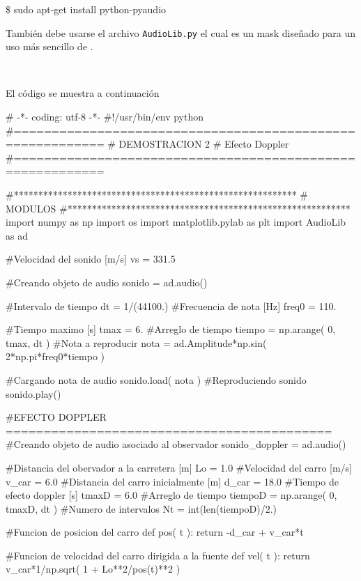 \begin{listing}[style=consola, numbers=none]
\$ sudo apt-get install python-pyaudio
\end{listing}

También debe usarse el archivo \texttt{AudioLib.py} el cual es un mask 
diseñado para un uso más sencillo de \pyaudio.

\

El código se muestra a continuación


\begin{listing}[style=python]
# -*- coding: utf-8 -*-
#!/usr/bin/env python
#==========================================================
# DEMOSTRACION 2
# Efecto Doppler
#==========================================================

#**********************************************************
#	MODULOS
#**********************************************************
import numpy as np
import os
import matplotlib.pylab as plt
import AudioLib as ad

#Velocidad del sonido [m/s]
vs = 331.5

#Creando objeto de audio
sonido = ad.audio()

#Intervalo de tiempo
dt = 1/(44100.)
#Frecuencia de nota [Hz]
freq0 = 110.

#Tiempo maximo	[s]
tmax = 6.
#Arreglo de tiempo
tiempo = np.arange( 0, tmax, dt )
#Nota a reproducir
nota = ad.Amplitude*np.sin( 2*np.pi*freq0*tiempo )

#Cargando nota de audio
sonido.load( nota )
#Reproduciendo sonido
sonido.play()

#EFECTO DOPPLER ===========================================
#Creando objeto de audio asociado al observador
sonido_doppler = ad.audio()

#Distancia del obervador a la carretera [m]
Lo = 1.0
#Velocidad del carro [m/s]
v_car = 6.0
#Distancia del carro inicialmente [m]
d_car = 18.0
#Tiempo de efecto doppler [s]
tmaxD = 6.0
#Arreglo de tiempo
tiempoD = np.arange( 0, tmaxD, dt )
#Numero de intervalos
Nt = int(len(tiempoD)/2.)

#Funcion de posicion del carro
def pos( t ):
    return -d_car + v_car*t
    
#Funcion de velocidad del carro dirigida a la fuente
def vel( t ):
    return v_car*1/np.sqrt( 1 + Lo**2/pos(t)**2 )
    

\end{listing}
